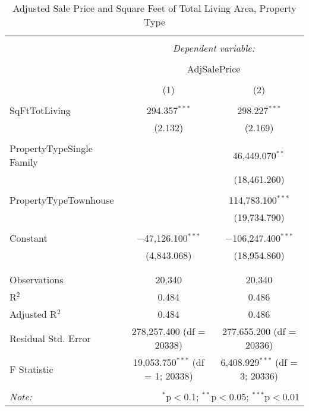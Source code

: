 \documentclass[12pt,letterpaper]{article}
\begin{document}
\begin{table}[!htbp] \centering 
	\caption{Adjusted Sale Price and Square Feet of Total Living Area, Property Type} 
	\label{} 
	\begin{tabular}{@{\extracolsep{5pt}}lcc} 
		\\[-1.8ex]\hline 
		\hline \\[-1.8ex] 
		& \multicolumn{2}{c}{\textit{Dependent variable:}} \\ 
		\cline{2-3} 
		\\[-1.8ex] & \multicolumn{2}{c}{AdjSalePrice} \\ 
		\\[-1.8ex] & (1) & (2)\\ 
		\hline \\[-1.8ex] 
		SqFtTotLiving & 294.357$^{***}$ & 298.227$^{***}$ \\ 
		& (2.132) & (2.169) \\ 
		& & \\ 
		PropertyTypeSingle Family &  & 46,449.070$^{**}$ \\ 
		&  & (18,461.260) \\ 
		& & \\ 
		PropertyTypeTownhouse &  & 114,783.100$^{***}$ \\ 
		&  & (19,734.790) \\ 
		& & \\ 
		Constant & $-$47,126.100$^{***}$ & $-$106,247.400$^{***}$ \\ 
		& (4,843.068) & (18,954.860) \\ 
		& & \\ 
		\hline \\[-1.8ex] 
		Observations & 20,340 & 20,340 \\ 
		R$^{2}$ & 0.484 & 0.486 \\ 
		Adjusted R$^{2}$ & 0.484 & 0.486 \\ 
		Residual Std. Error & 278,257.400 (df = 20338) & 277,655.200 (df = 20336) \\ 
		F Statistic & 19,053.750$^{***}$ (df = 1; 20338) & 6,408.929$^{***}$ (df = 3; 20336) \\ 
		\hline 
		\hline \\[-1.8ex] 
		\textit{Note:}  & \multicolumn{2}{r}{$^{*}$p$<$0.1; $^{**}$p$<$0.05; $^{***}$p$<$0.01} \\ 
	\end{tabular} 
\end{table} 
\end{document}
